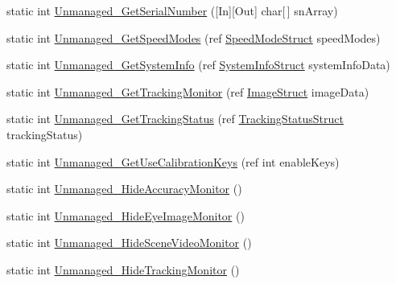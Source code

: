 \begin{DoxyCompactItemize}
static int \hyperlink{class_web_analyzer_1_1_eye_tracking_1_1_eye_tracking_controller_a46e8a3b9cc2280b7e231e76cedc021e3}{Unmanaged\+\_\+\+Get\+Serial\+Number} (\mbox{[}In\mbox{]}\mbox{[}Out\mbox{]} char\mbox{[}$\,$\mbox{]} sn\+Array)
\item 
static int \hyperlink{class_web_analyzer_1_1_eye_tracking_1_1_eye_tracking_controller_ad5de45acbe9776562e3ef10b84bb22f3}{Unmanaged\+\_\+\+Get\+Speed\+Modes} (ref \hyperlink{struct_web_analyzer_1_1_eye_tracking_1_1_eye_tracking_controller_1_1_speed_mode_struct}{Speed\+Mode\+Struct} speed\+Modes)
\item 
static int \hyperlink{class_web_analyzer_1_1_eye_tracking_1_1_eye_tracking_controller_a871d326dc0a6982290dffa97b78b509a}{Unmanaged\+\_\+\+Get\+System\+Info} (ref \hyperlink{struct_web_analyzer_1_1_eye_tracking_1_1_eye_tracking_controller_1_1_system_info_struct}{System\+Info\+Struct} system\+Info\+Data)
\item 
static int \hyperlink{class_web_analyzer_1_1_eye_tracking_1_1_eye_tracking_controller_a59f73d8b0479c7a6d062365d67c397fa}{Unmanaged\+\_\+\+Get\+Tracking\+Monitor} (ref \hyperlink{struct_web_analyzer_1_1_eye_tracking_1_1_eye_tracking_controller_1_1_image_struct}{Image\+Struct} image\+Data)
\item 
static int \hyperlink{class_web_analyzer_1_1_eye_tracking_1_1_eye_tracking_controller_a31031433e2a3b74ff9d6509f9422ae14}{Unmanaged\+\_\+\+Get\+Tracking\+Status} (ref \hyperlink{struct_web_analyzer_1_1_eye_tracking_1_1_eye_tracking_controller_1_1_tracking_status_struct}{Tracking\+Status\+Struct} tracking\+Status)
\item 
static int \hyperlink{class_web_analyzer_1_1_eye_tracking_1_1_eye_tracking_controller_a907ff51f94a1e3d13c56db22ff7b3976}{Unmanaged\+\_\+\+Get\+Use\+Calibration\+Keys} (ref int enable\+Keys)
\item 
static int \hyperlink{class_web_analyzer_1_1_eye_tracking_1_1_eye_tracking_controller_a07676501479b66f86c997cc9f25086fe}{Unmanaged\+\_\+\+Hide\+Accuracy\+Monitor} ()
\item 
static int \hyperlink{class_web_analyzer_1_1_eye_tracking_1_1_eye_tracking_controller_a522dcf958818497e50cbd4ab2fd304bd}{Unmanaged\+\_\+\+Hide\+Eye\+Image\+Monitor} ()
\item 
static int \hyperlink{class_web_analyzer_1_1_eye_tracking_1_1_eye_tracking_controller_ac6a3a9776164274f27e0a5cac0c8991a}{Unmanaged\+\_\+\+Hide\+Scene\+Video\+Monitor} ()
\item 
static int \hyperlink{class_web_analyzer_1_1_eye_tracking_1_1_eye_tracking_controller_a4762198d4a33fe0e58591986932108b0}{Unmanaged\+\_\+\+Hide\+Tracking\+Monitor} ()

\end{DoxyCompactItemize}
